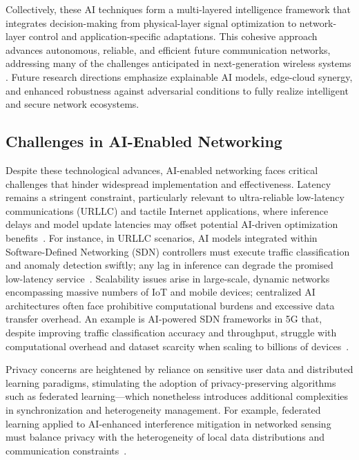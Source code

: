 \documentclass[sigconf]{acmart}
\begin{document}
Collectively, these AI techniques form a multi-layered intelligence framework that integrates decision-making from physical-layer signal optimization to network-layer control and application-specific adaptations. This cohesive approach advances autonomous, reliable, and efficient future communication networks, addressing many of the challenges anticipated in next-generation wireless systems \cite{ref11,ref49,ref50}. Future research directions emphasize explainable AI models, edge-cloud synergy, and enhanced robustness against adversarial conditions to fully realize intelligent and secure network ecosystems.

\subsection{Challenges in AI-Enabled Networking}

Despite these technological advances, AI-enabled networking faces critical challenges that hinder widespread implementation and effectiveness. Latency remains a stringent constraint, particularly relevant to ultra-reliable low-latency communications (URLLC) and tactile Internet applications, where inference delays and model update latencies may offset potential AI-driven optimization benefits~\cite{ref26,ref27}. For instance, in URLLC scenarios, AI models integrated within Software-Defined Networking (SDN) controllers must execute traffic classification and anomaly detection swiftly; any lag in inference can degrade the promised low-latency service~\cite{ref52}. Scalability issues arise in large-scale, dynamic networks encompassing massive numbers of IoT and mobile devices; centralized AI architectures often face prohibitive computational burdens and excessive data transfer overhead. An example is AI-powered SDN frameworks in 5G that, despite improving traffic classification accuracy and throughput, struggle with computational overhead and dataset scarcity when scaling to billions of devices~\cite{ref28,ref52}. 

Privacy concerns are heightened by reliance on sensitive user data and distributed learning paradigms, stimulating the adoption of privacy-preserving algorithms such as federated learning—which nonetheless introduces additional complexities in synchronization and heterogeneity management. For example, federated learning applied to AI-enhanced interference mitigation in networked sensing must balance privacy with the heterogeneity of local data distributions and communication constraints~\cite{ref29,ref48,ref52}.
\end{document}
